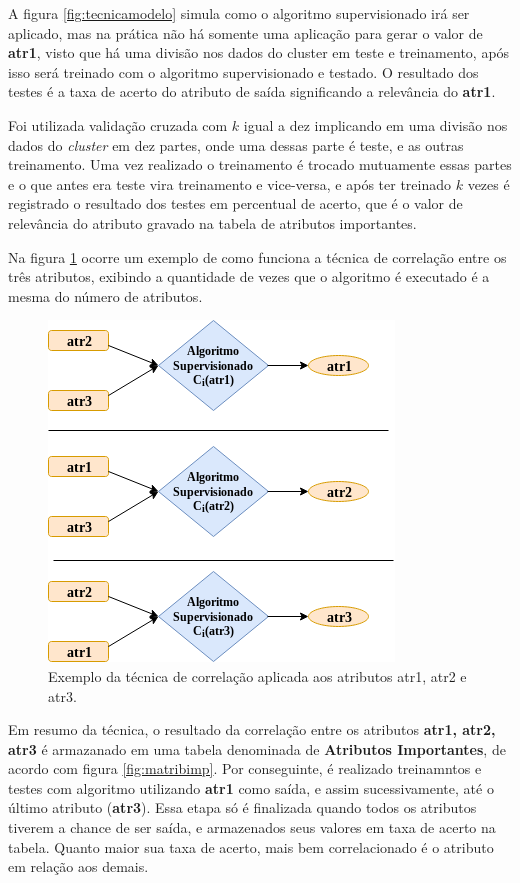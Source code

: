 A figura \ref{fig:tecnicamodelo} simula como o algoritmo supervisionado irá ser aplicado, mas na prática não há somente uma aplicação para gerar o valor de 
\textbf{atr1}, visto que há uma divisão nos dados do cluster em teste e treinamento, após isso será treinado com o algoritmo supervisionado e testado. O resultado dos testes é a taxa de acerto do atributo de saída significando a relevância do \textbf{atr1}.

Foi utilizada validação cruzada com ${k}$ igual a dez implicando em uma divisão nos dados do \textit{cluster}  em dez partes, onde uma dessas parte é teste, e as outras treinamento. Uma vez realizado o treinamento é trocado mutuamente essas partes e o que antes era teste vira treinamento e vice-versa, e após ter treinado ${k}$ vezes é registrado o resultado dos testes em percentual de acerto, que é o valor de relevância do atributo gravado na tabela de atributos importantes.

Na figura \ref{fig:tecnicamodelocomp} ocorre um exemplo de como funciona a técnica de correlação entre os três atributos, exibindo a quantidade de vezes que o algoritmo é executado é a mesma do número de atributos.

\begin{figure}[h!]
        \centering
        \includegraphics[scale=0.7]{figs/tecnicamodeloComp.png}
        \caption{Exemplo da técnica de correlação aplicada aos atributos atr1, atr2 e atr3. } \label{fig:tecnicamodelocomp}
\end{figure}


Em resumo da técnica, o resultado da correlação entre os atributos \textbf{atr1, atr2, atr3}  é armazanado em uma tabela denominada de \textbf{Atributos Importantes}, de acordo com figura \ref{fig:matribimp}. Por conseguinte, é realizado treinamntos e testes com algoritmo utilizando \textbf{atr1} como saída, e assim sucessivamente, até o último atributo (\textbf{atr3}). Essa etapa só é finalizada quando todos os atributos tiverem a chance de ser saída, e armazenados seus valores em taxa de acerto na tabela. Quanto maior sua taxa de acerto, mais bem correlacionado é o atributo em relação aos demais.


